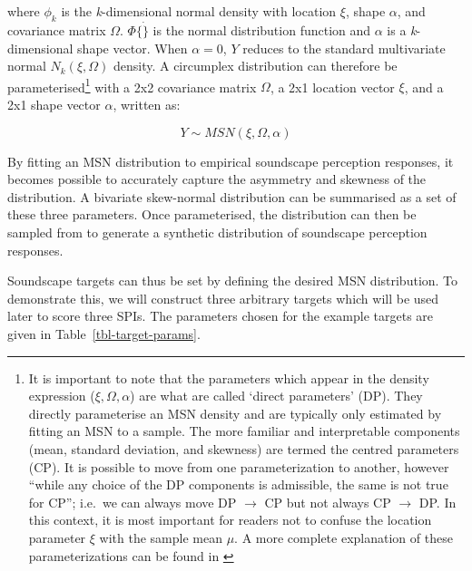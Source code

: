 \documentclass[
  authoryear,
  preprint,
  3p]{elsarticle}
\begin{document}
where \(\phi_k\) is the \emph{k}-dimensional normal density with
location \(\xi\), shape \(\alpha\), and covariance matrix \(\Omega\).
\(\Phi \{ \dot \}\) is the normal distribution function and \(\alpha\)
is a \emph{k}-dimensional shape vector. When \(\alpha = 0\), \(Y\)
reduces to the standard multivariate normal \(N_k(\xi, \Omega)\)
density. A circumplex distribution can therefore be
parameterised\footnote{It is important to note that the parameters which
  appear in the density expression (\(\xi, \Omega, \alpha\)) are what
  are called `direct parameters' (DP). They directly parameterise an MSN
  density and are typically only estimated by fitting an MSN to a
  sample. The more familiar and interpretable components (mean, standard
  deviation, and skewness) are termed the centred parameters (CP). It is
  possible to move from one parameterization to another, however ``while
  any choice of the DP components is admissible, the same is not true
  for CP''; i.e.~we can always move DP \(\rightarrow\) CP but not always
  CP \(\rightarrow\) DP. In this context, it is most important for
  readers not to confuse the location parameter \(\xi\) with the sample
  mean \(\mu\). A more complete explanation of these parameterizations
  can be found in \citet{Azzalini2016How}} with a 2x2 covariance matrix
\(\Omega\), a 2x1 location vector \(\xi\), and a 2x1 shape vector
\(\alpha\), written as:

\[
Y \sim MSN (\xi, \Omega, \alpha)
\]

By fitting an MSN distribution to empirical soundscape perception
responses, it becomes possible to accurately capture the asymmetry and
skewness of the distribution. A bivariate skew-normal distribution can
be summarised as a set of these three parameters. Once parameterised,
the distribution can then be sampled from to generate a synthetic
distribution of soundscape perception responses.

Soundscape targets can thus be set by defining the desired MSN
distribution. To demonstrate this, we will construct three arbitrary
targets which will be used later to score three SPIs. The parameters
chosen for the example targets are given in
Table~\ref{tbl-target-params}.
\end{document}
